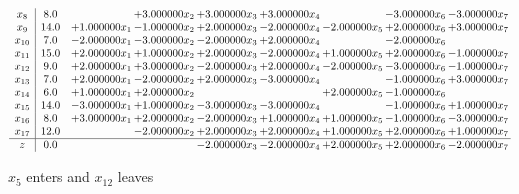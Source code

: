 \documentclass[10pt]{article}
\begin{document}
\[\begin{array}{c| c c@{\hskip 2pt} c@{\hskip 2pt} c@{\hskip 2pt} c@{\hskip 2pt} c@{\hskip 2pt} c@{\hskip 2pt} c@{\hskip 2pt} }
 x_{8}   &  8.0  &   & + 3.000000 x_{2} & + 3.000000 x_{3} & + 3.000000 x_{4} &   & -3.000000 x_{6} & -3.000000 x_{7}\\
 x_{9}   &  14.0 & + 1.000000 x_{1} & -1.000000 x_{2} & + 2.000000 x_{3} & -2.000000 x_{4} & -2.000000 x_{5} & + 2.000000 x_{6} & + 3.000000 x_{7}\\
 x_{10}   &  7.0 & -2.000000 x_{1} & -3.000000 x_{2} & -2.000000 x_{3} & + 2.000000 x_{4} &   & -2.000000 x_{6} &   \\
 x_{11}   &  15.0 & + 2.000000 x_{1} & + 1.000000 x_{2} & + 2.000000 x_{3} & -2.000000 x_{4} & + 1.000000 x_{5} & + 2.000000 x_{6} & -1.000000 x_{7}\\
 x_{12}   &  9.0 & + 2.000000 x_{1} & + 3.000000 x_{2} & -2.000000 x_{3} & + 2.000000 x_{4} & -2.000000 x_{5} & -3.000000 x_{6} & -1.000000 x_{7}\\
 x_{13}   &  7.0 & + 2.000000 x_{1} & -2.000000 x_{2} & + 2.000000 x_{3} & -3.000000 x_{4} &   & -1.000000 x_{6} & + 3.000000 x_{7}\\
 x_{14}   &  6.0 & + 1.000000 x_{1} & + 2.000000 x_{2} &    &   & + 2.000000 x_{5} & -1.000000 x_{6} &   \\
 x_{15}   &  14.0 & -3.000000 x_{1} & + 1.000000 x_{2} & -3.000000 x_{3} & -3.000000 x_{4} &   & -1.000000 x_{6} & + 1.000000 x_{7}\\
 x_{16}   &  8.0 & + 3.000000 x_{1} & + 2.000000 x_{2} & -2.000000 x_{3} & + 1.000000 x_{4} & + 1.000000 x_{5} & -1.000000 x_{6} & -3.000000 x_{7}\\
 x_{17}   &  12.0  &   & -2.000000 x_{2} & + 2.000000 x_{3} & + 2.000000 x_{4} & + 1.000000 x_{5} & + 2.000000 x_{6} & + 1.000000 x_{7}\\
\hline
z    &  0.0  &    &   & -2.000000 x_{3} & -2.000000 x_{4} & + 2.000000 x_{5} & + 2.000000 x_{6} & -2.000000 x_{7}\\
\end{array}\]


 $ x_{5} $ enters and $ x_{12} $ leaves 
\end{document}
